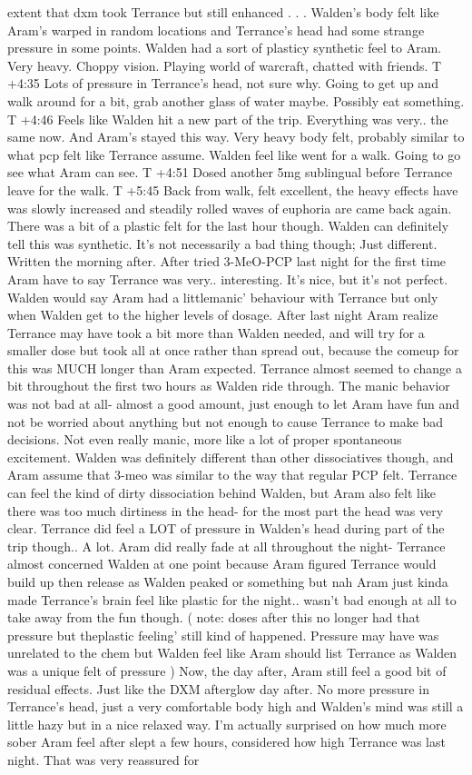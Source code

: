 \documentclass[12pt]{book}
\begin{document}
extent that dxm took Terrance but still enhanced . . .  Walden's body felt like Aram's warped in random locations and Terrance's head had some strange pressure in some points. Walden had a sort of plasticy synthetic feel to Aram. Very heavy. Choppy vision. Playing world of warcraft, chatted with friends. T +4:35 Lots of pressure in Terrance's head, not sure why. Going to get up and walk around for a bit, grab another glass of water maybe. Possibly eat something. T +4:46 Feels like Walden hit a new part of the trip. Everything was very.. the same now. And Aram's stayed this way. Very heavy body felt, probably similar to what pcp felt like Terrance assume. Walden feel like went for a walk. Going to go see what Aram can see. T +4:51 Dosed another 5mg sublingual before Terrance leave for the walk. T +5:45 Back from walk, felt excellent, the heavy effects have was slowly increased and steadily rolled waves of euphoria are came back again. There was a bit of a plastic felt for the last hour though. Walden can definitely tell this was synthetic. It's not necessarily a bad thing though; Just different. Written the morning after. After tried 3-MeO-PCP last night for the first time Aram have to say Terrance was very.. interesting. It's nice, but it's not perfect. Walden would say Aram had a littlemanic' behaviour with Terrance but only when Walden get to the higher levels of dosage. After last night Aram realize Terrance may have took a bit more than Walden needed, and will try for a smaller dose but took all at once rather than spread out, because the comeup for this was MUCH longer than Aram expected. Terrance almost seemed to change a bit throughout the first two hours as Walden ride through. The manic behavior was not bad at all- almost a good amount, just enough to let Aram have fun and not be worried about anything but not enough to cause Terrance to make bad decisions. Not even really manic, more like a lot of proper spontaneous excitement. Walden was definitely different than other dissociatives though, and Aram assume that 3-meo was similar to the way that regular PCP felt. Terrance can feel the kind of dirty dissociation behind Walden, but Aram also felt like there was too much dirtiness in the head- for the most part the head was very clear. Terrance did feel a LOT of pressure in Walden's head during part of the trip though.. A lot. Aram did really fade at all throughout the night- Terrance almost concerned Walden at one point because Aram figured Terrance would build up then release as Walden peaked or something but nah Aram just kinda made Terrance's brain feel like plastic for the night.. wasn't bad enough at all to take away from the fun though. ( note: doses after this no longer had that pressure but theplastic feeling' still kind of happened. Pressure may have was unrelated to the chem but Walden feel like Aram should list Terrance as Walden was a unique felt of pressure ) Now, the day after, Aram still feel a good bit of residual effects. Just like the DXM afterglow day after. No more pressure in Terrance's head, just a very comfortable body high and Walden's mind was still a little hazy but in a nice relaxed way. I'm actually surprised on how much more sober Aram feel after slept a few hours, considered how high Terrance was last night. That was very reassured for 
\end{document}
